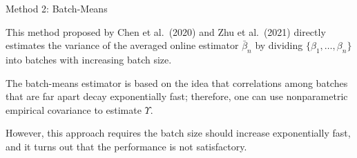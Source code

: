 \documentclass[beamer, t]{beamer}
\begin{document}
\begin{frame}{Method 2: Batch-Means}



This method proposed by Chen et al.~(2020) and Zhu et al.~(2021) directly estimates the variance of the averaged online estimator $\bar{\beta}_{n}$
by dividing $\{\beta_1,\ldots,\beta_n\}$ into batches with increasing
batch size.

\bigskip 
The batch-means estimator is based on the idea that correlations among batches that are far apart decay exponentially fast; therefore, one can use nonparametric empirical covariance to estimate $\Upsilon$.

\bigskip
However, this approach requires the batch size should increase exponentially fast, and it turns out that the performance is not satisfactory. 
\end{frame}

\end{document}
